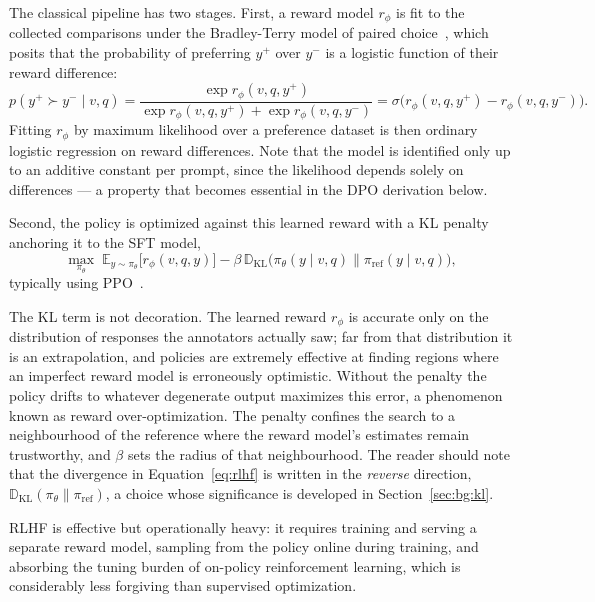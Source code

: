 The classical pipeline has two stages. First, a reward model $r_\phi$ is fit to the collected comparisons under the Bradley-Terry model of paired choice~\cite{bradley1952rank}, which posits that the probability of preferring $y^+$ over $y^-$ is a logistic function of their reward difference:
\begin{equation}\label{eq:bt}
p(y^+ \succ y^- \mid v, q) = \frac{\exp r_\phi(v,q,y^+)}{\exp r_\phi(v,q,y^+) + \exp r_\phi(v,q,y^-)} = \sigma\big(r_\phi(v,q,y^+) - r_\phi(v,q,y^-)\big).
\end{equation}
Fitting $r_\phi$ by maximum likelihood over a preference dataset is then ordinary logistic regression on reward differences. Note that the model is identified only up to an additive constant per prompt, since the likelihood depends solely on differences --- a property that becomes essential in the DPO derivation below.

Second, the policy is optimized against this learned reward with a KL penalty anchoring it to the SFT model,
\begin{equation}\label{eq:rlhf}
\max_{\pi_\theta}\; \mathbb{E}_{y \sim \pi_\theta}\big[r_\phi(v,q,y)\big] - \beta\, \mathbb{D}_{\text{KL}}\big(\pi_\theta(y \mid v,q) \parallel \pi_{\text{ref}}(y \mid v,q)\big),
\end{equation}
typically using PPO~\cite{schulman2017proximal}.

The KL term is not decoration. The learned reward $r_\phi$ is accurate only on the distribution of responses the annotators actually saw; far from that distribution it is an extrapolation, and policies are extremely effective at finding regions where an imperfect reward model is erroneously optimistic. Without the penalty the policy drifts to whatever degenerate output maximizes this error, a phenomenon known as reward over-optimization. The penalty confines the search to a neighbourhood of the reference where the reward model's estimates remain trustworthy, and $\beta$ sets the radius of that neighbourhood. The reader should note that the divergence in Equation~\ref{eq:rlhf} is written in the \emph{reverse} direction, $\mathbb{D}_{\text{KL}}(\pi_\theta \parallel \pi_{\text{ref}})$, a choice whose significance is developed in Section~\ref{sec:bg:kl}.

RLHF is effective but operationally heavy: it requires training and serving a separate reward model, sampling from the policy online during training, and absorbing the tuning burden of on-policy reinforcement learning, which is considerably less forgiving than supervised optimization.

